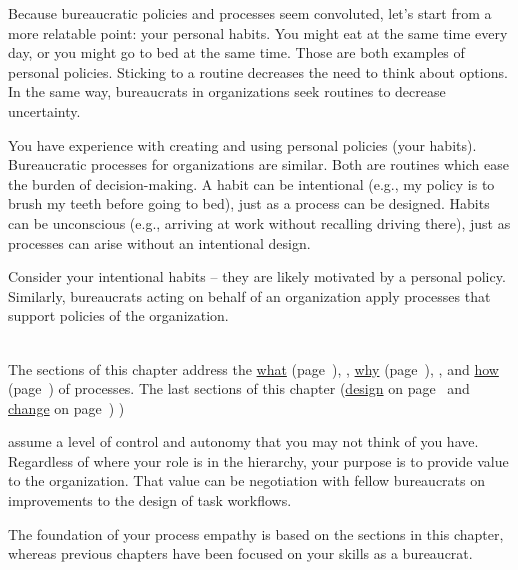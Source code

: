 
Because bureaucratic policies and processes seem convoluted, let's start from a more relatable point: your personal habits.
You might eat at the same time every day, or you might go to bed at the same time. Those are both examples of personal policies. Sticking to a routine decreases the need to think about options. In the same way, bureaucrats in organizations seek routines to decrease uncertainty. 

You have experience with creating and using personal policies (your habits).  Bureaucratic processes for organizations are similar.
Both are routines which ease the burden of decision-making. A habit can be intentional (e.g., my policy is to brush my teeth before going to bed), just as a process can be designed. Habits can be unconscious (e.g., arriving at work without recalling driving there), just as processes can arise without an intentional design. 

Consider your intentional habits -- they are likely motivated by a personal policy. Similarly, bureaucrats acting on behalf of an organization apply processes that support policies of the organization.

\ \\

The sections of this chapter address 
the \hyperref[sec:definition-of-process]{what}\ifhaspagenumbers
(page~\pageref{sec:definition-of-process}), 
\else
, 
\fi
\hyperref[sec:why-processes-exist]{why}\ifhaspagenumbers
(page~\pageref{sec:why-processes-exist}), 
\else
, 
\fi
and 
\hyperref[sec:process-chaos]{how} 
\ifhaspagenumbers
(page~\pageref{sec:process-chaos}) 
\fi
of processes. 
The last sections of this chapter 
(\hyperref[sec:design-of-processes]{design} 
\ifhaspagenumbers
on page~\pageref{sec:design-of-processes} 
\fi
and 
\hyperref[sec:change-a-process]{change}\ifhaspagenumbers
on page~\pageref{sec:change-a-process})
\else
)
\fi
 
assume a level of control and autonomy that you may not think of you have. Regardless of where your role is in the hierarchy, your purpose is to provide value to the organization. That value can be negotiation with fellow bureaucrats on improvements to the design of task workflows. 

The foundation of your \gls{process empathy} is based on the sections in this chapter, whereas previous chapters have been focused on your skills as a bureaucrat. 